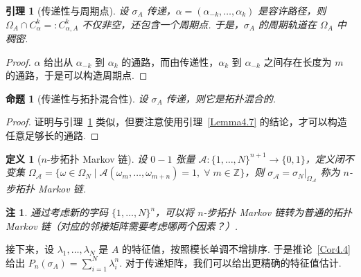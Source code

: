 \documentclass[11pt, a4paper, oneside]{ctexart}
\newtheorem{definition}[theorem]{定义}
\newtheorem{lemma}[theorem]{引理}
\newtheorem{proposition}[theorem]{命题}
\newtheorem{remark}[theorem]{注}
\newcommand{\Z}{\mathbb{Z}}
\newcommand{\cA}{\mathcal{A}}
\begin{document}
    \begin{lemma}[传递性与周期点]\label{Lemma4.8}
        设 $\sigma_A$ 传递，$\alpha=(\alpha_{-k},\ldots,\alpha_k)$ 是容许路径，则 $\Omega_A\cap C_{\alpha}^{k}=:C_{\alpha,A}^{k}$ 不仅非空，还包含一个周期点. 于是，$\sigma_A$ 的周期轨道在 $\Omega_A$ 中稠密.
    \end{lemma}
    \begin{proof}
        $\alpha$ 给出从 $\alpha_{-k}$ 到 $\alpha_k$ 的通路，而由传递性，$\alpha_k$ 到 $\alpha_{-k}$ 之间存在长度为 $m$ 的通路，于是可以构造周期点.
    \end{proof}

    \begin{proposition}[传递性与拓扑混合性]\label{Prop4.9}
        设 $\sigma_A$ 传递，则它是拓扑混合的.
    \end{proposition}
    \begin{proof}
        证明与引理~\ref{Lemma4.8} 类似，但要注意使用引理~\ref{Lemma4.7} 的结论，才可以构造任意足够长的通路.
    \end{proof}

    \begin{definition}[$n$-步拓扑 Markov 链]
        设 $0-1$ 张量 $\cA:{\{1,\ldots,N\}}^{n+1}\to \{0,1\}$，定义闭不变集 $\Omega_{\cA}=\{\omega\in\Omega_N\mid \cA(\omega_m,\ldots,\omega_{m+n})=1,\;\forall\; m\in\Z\}$，则 $\sigma_{\cA}=\sigma_N|_{\Omega_{\cA}}$ 称为 $n$-步拓扑 Markov 链.
    \end{definition}
    \begin{remark}
        通过考虑新的字码 ${\{1,\ldots,N\}}^n$，可以将 $n$-步拓扑 Markov 链转为普通的拓扑 Markov 链（对应的邻接矩阵需要考虑哪两个因素？）.
    \end{remark}

    接下来，设 $\lambda_1,\ldots,\lambda_N$ 是 $A$ 的特征值，按照模长单调不增排序. 于是推论~\ref{Cor4.4} 给出 $P_n(\sigma_A)=\sum\limits_{i=1}^{N}\lambda_i^n$. 对于传递矩阵，我们可以给出更精确的特征值估计.
\end{document}
